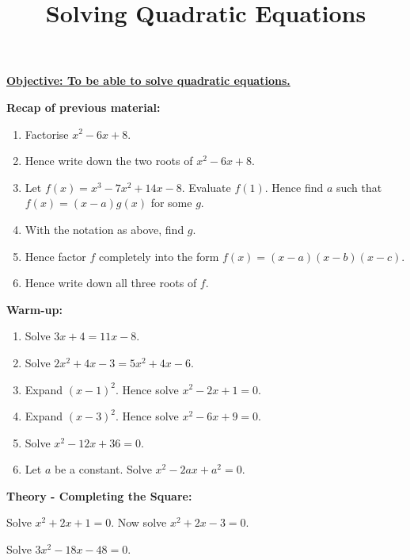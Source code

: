 \documentclass{article}
\begin{document}
\title{Solving Quadratic Equations}
\date{}

\maketitle

\Large

{\bf \underline{Objective: To be able to solve quadratic equations.}}

\vspace{5mm}


{\bf Recap of previous material:}

\vspace{5mm}

\begin{enumerate}
\item Factorise $x^2-6x+8$.
\item Hence write down the two roots of $x^2-6x+8$.
\item Let $f(x)=x^3-7x^2+14x-8$. Evaluate $f(1)$. Hence find $a$ such that $f(x)=(x-a)g(x)$ for some $g$.
\item With the notation as above, find $g$.
\item Hence factor $f$ completely into the form $f(x)=(x-a)(x-b)(x-c)$.
\item Hence write down all three roots of $f$.
\end{enumerate}


\clearpage

{\bf Warm-up:}

\vspace{5mm}

\begin{enumerate}
\item Solve $3x+4=11x-8$.
\item Solve $2x^2+4x-3=5x^2+4x-6$.
\item Expand $(x-1)^2$. Hence solve $x^2-2x+1=0$.
\item Expand $(x-3)^2$. Hence solve $x^2-6x+9=0$.
\item Solve $x^2-12x+36=0$.
\item Let $a$ be a constant. Solve $x^2-2ax+a^2=0$.
\end{enumerate}

\clearpage


{\bf Theory - Completing the Square:}

Solve $x^2+2x+1=0$. Now solve $x^2+2x-3=0$.

\vfill

Solve $3x^2-18x-48=0$.
\end{document}
